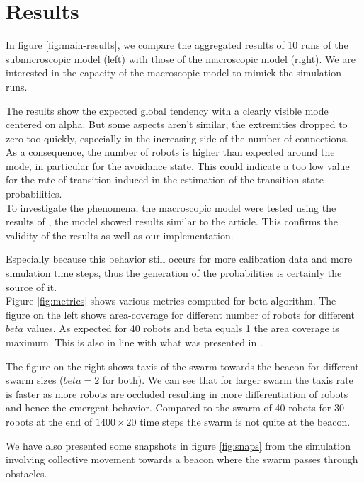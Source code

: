 \documentclass[a4paper, 10pt, conference]{ieeeconf}
\begin{document}
\section{Results}
  In figure \ref{fig:main-results}, we compare the aggregated results of 10 runs of the submicroscopic model (left) with those of the macroscopic model (right). We are interested in the capacity of the macroscopic model to mimick the simulation runs.

  The results show the expected global tendency with a clearly visible mode centered on alpha. But some aspects aren't similar, the extremities dropped to zero too quickly, especially in the increasing side of the number of connections. As a consequence, the number of robots is higher than expected around the mode, in particular for the avoidance state. This could indicate a too low value for the rate of transition induced in the estimation of the transition state probabilities.\\

  To investigate the phenomena, the macroscopic model were tested using the results of \cite{Winfield08}, the model showed results similar to the article. This confirms the validity of the results as well as our implementation.

  Especially because this behavior still occurs for more calibration data and more simulation time steps, thus the generation of the probabilities is certainly the source of it. \\

  Figure \ref{fig:metrics} shows various metrics computed for beta algorithm. The figure on the left shows area-coverage for different number of robots for different $beta$ values. As expected for 40 robots and beta equals 1 the area coverage is maximum. This is also in line with what was presented in \cite{Nembrini02}.

  The figure on the right shows taxis of the swarm towards the beacon for different swarm sizes ($beta = 2$ for both). We can see that for larger swarm the taxis rate is faster as more robots are occluded resulting in more differentiation of robots and hence the emergent behavior. Compared to the swarm of 40 robots for 30 robots at the end of $1400 \times 20$ time steps the swarm is not quite at the beacon. 

  We have also presented some snapshots in figure \ref{fig:snaps} from the simulation involving collective movement towards a beacon where the swarm passes through obstacles.  
\end{document}
